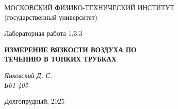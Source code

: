 \thispagestyle{empty}

\begin{center}
    МОСКОВСКИЙ ФИЗИКО-ТЕХНИЧЕСКИЙ ИНСТИТУТ \\
    (государственный университет)
\end{center}

\vfill

\begin{center}
    Лабораторная работа 1.3.3 \\ 
    \vspace{20pt}
    
    \textbf{ИЗМЕРЕНИЕ ВЯЗКОСТИ ВОЗДУХА ПО } \\
    \textbf{ТЕЧЕНИЮ В ТОНКИХ ТРУБКАХ} \\
\end{center}  

\begin{center}
    \textit{Янковский Д. С.} \\
    \textit{Б01-405} \\
\end{center}  

\vfill

\begin{center}
    Долгопрудный, 2025
\end{center}